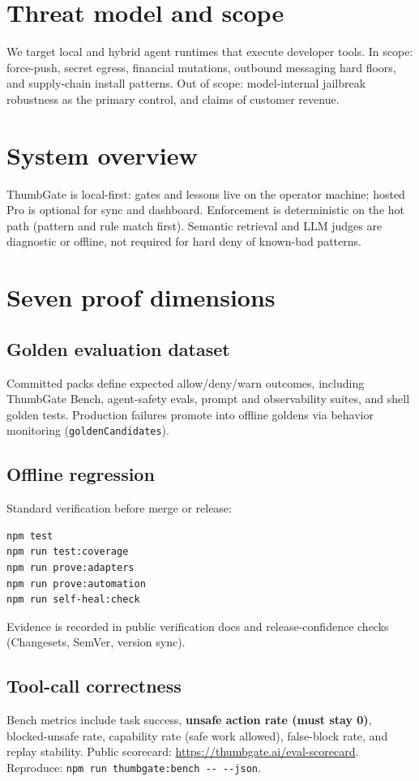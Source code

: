 \documentclass[11pt]{article}
\begin{document}
\section{Threat model and scope}
We target local and hybrid agent runtimes that execute developer tools. In scope: force-push, secret egress, financial mutations, outbound messaging hard floors, and supply-chain install patterns. Out of scope: model-internal jailbreak robustness as the primary control, and claims of customer revenue.

\section{System overview}
ThumbGate is local-first: gates and lessons live on the operator machine; hosted Pro is optional for sync and dashboard. Enforcement is deterministic on the hot path (pattern and rule match first). Semantic retrieval and LLM judges are diagnostic or offline, not required for hard deny of known-bad patterns.

\section{Seven proof dimensions}
\subsection{Golden evaluation dataset}
Committed packs define expected allow/deny/warn outcomes, including ThumbGate Bench, agent-safety evals, prompt and observability suites, and shell golden tests. Production failures promote into offline goldens via behavior monitoring (\texttt{goldenCandidates}).

\subsection{Offline regression}
Standard verification before merge or release:
\begin{verbatim}
npm test
npm run test:coverage
npm run prove:adapters
npm run prove:automation
npm run self-heal:check
\end{verbatim}
Evidence is recorded in public verification docs and release-confidence checks (Changesets, SemVer, version sync).

\subsection{Tool-call correctness}
Bench metrics include task success, \textbf{unsafe action rate (must stay 0)}, blocked-unsafe rate, capability rate (safe work allowed), false-block rate, and replay stability. Public scorecard: \url{https://thumbgate.ai/eval-scorecard}. Reproduce: \texttt{npm run thumbgate:bench -{}- -{}-json}.
\end{document}
